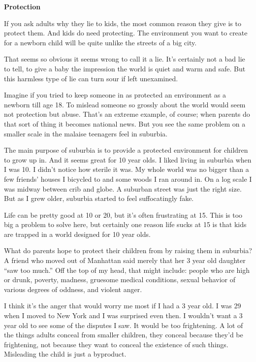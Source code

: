\textbf{Protection}

If you ask adults why they lie to kids, the most common reason they give
is to protect them. And kids do need protecting. The environment you
want to create for a newborn child will be quite unlike the streets of a
big city.

That seems so obvious it seems wrong to call it a lie. It's certainly
not a bad lie to tell, to give a baby the impression the world is quiet
and warm and safe. But this harmless type of lie can turn sour if left
unexamined.

Imagine if you tried to keep someone in as protected an environment as a
newborn till age 18. To mislead someone so grossly about the world would
seem not protection but abuse. That's an extreme example, of course;
when parents do that sort of thing it becomes national news. But you see
the same problem on a smaller scale in the malaise teenagers feel in
suburbia.

The main purpose of suburbia is to provide a protected environment for
children to grow up in. And it seems great for 10 year olds. I liked
living in suburbia when I was 10. I didn't notice how sterile it was. My
whole world was no bigger than a few friends' houses I bicycled to and
some woods I ran around in. On a log scale I was midway between crib and
globe. A suburban street was just the right size. But as I grew older,
suburbia started to feel suffocatingly fake.

Life can be pretty good at 10 or 20, but it's often frustrating at 15.
This is too big a problem to solve here, but certainly one reason life
sucks at 15 is that kids are trapped in a world designed for 10 year
olds.

What do parents hope to protect their children from by raising them in
suburbia? A friend who moved out of Manhattan said merely that her 3
year old daughter ``saw too much.'' Off the top of my head, that might
include: people who are high or drunk, poverty, madness, gruesome
medical conditions, sexual behavior of various degrees of oddness, and
violent anger.

I think it's the anger that would worry me most if I had a 3 year old. I
was 29 when I moved to New York and I was surprised even then. I
wouldn't want a 3 year old to see some of the disputes I saw. It would
be too frightening. A lot of the things adults conceal from smaller
children, they conceal because they'd be frightening, not because they
want to conceal the existence of such things. Misleading the child is
just a byproduct.


